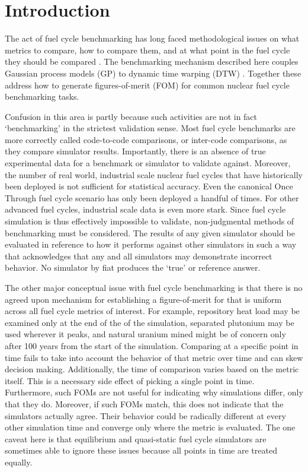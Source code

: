 \section{Introduction}
\label{intro}
The act of fuel cycle benchmarking has long faced methodological issues 
on what metrics to compare, how to compare them, and at what point in the
fuel cycle they should be compared 
\cite{wilson2011comparing,guerin2009benchmark,piet2011assessment}. 
The benchmarking mechanism described 
here couples Gaussian process models (GP) \cite{rasmussen2006gaussian} to 
dynamic time warping (DTW) \cite{muller}. Together these address how to 
generate figures-of-merit (FOM) for common nuclear fuel cycle benchmarking
tasks. 

Confusion in this area is partly because such activities 
are not in fact `benchmarking' in the strictest validation sense. Most fuel
cycle benchmarks are more correctly called code-to-code comparisons, or 
inter-code comparisons, as they compare simulator results. Importantly, 
there is an absence of true experimental data for a benchmark or simulator
to validate against. Moreover, the number of 
real world, industrial scale nuclear fuel cycles that have historically been 
deployed is not sufficient for statistical accuracy. Even the canonical 
Once Through fuel cycle scenario has only been deployed a handful of times.
For other advanced fuel cycles, industrial scale data is even more stark. 
Since fuel cycle simulation is thus effectively impossible to validate, 
non-judgmental methods of benchmarking must be considered. The 
results of any given simulator should be evaluated in reference to how 
it performs against other simulators in such a way that acknowledges that 
any and all simulators may demonstrate incorrect behavior. No simulator
by fiat produces the `true' or reference answer.

The other major conceptual issue with fuel cycle benchmarking is that there 
is no agreed upon mechanism for establishing a figure-of-merit for 
that is uniform across all fuel cycle metrics of interest. For example, 
repository heat load may be examined only at the end of the of the simulation,
separated plutonium may be used wherever it peaks, and natural uranium 
mined might be of concern only after 100 years from the start of the 
simulation. Comparing at a specific point 
in time fails to take into account the behavior of that metric over time and 
can skew decision making. Additionally, the 
time of comparison varies based on the metric itself. This is a necessary 
side effect of picking a single point in time.
Furthermore, such FOMs are not useful for indicating why simulations differ, 
only that they do. Moreover, if such FOMs match, this does not indicate
that the simulators actually agree. Their behavior 
could be radically different at every other simulation time and converge
only where the metric is evaluated.  The one caveat 
here is that 
equilibrium and quasi-static fuel cycle simulators are sometimes able to 
ignore these issues because all points in time are treated equally.

